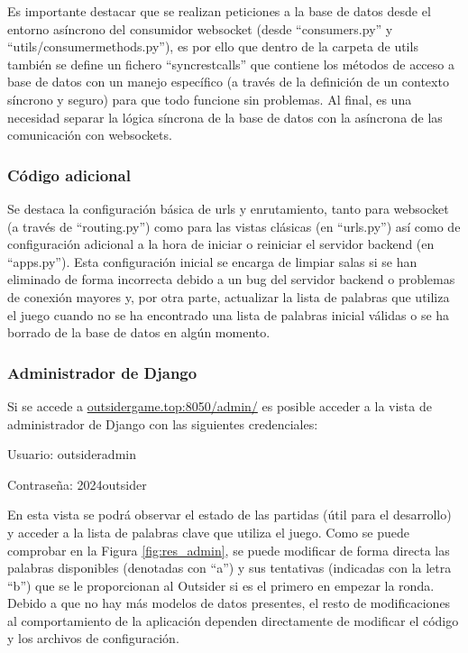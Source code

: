 Es importante destacar que se realizan peticiones a la base de datos desde el entorno asíncrono del consumidor websocket (desde ``consumers.py'' 
y ``utils/consumer\textunderscore methods.py''), es por ello que dentro de la carpeta de utils también se define un fichero ``sync\textunderscore rest\textunderscore calls'' que contiene 
los métodos de acceso a base de datos con un manejo específico (a través de la definición de un contexto síncrono y seguro) para que todo funcione sin problemas. Al final, es una necesidad
separar la lógica síncrona de la base de datos con la asíncrona de las comunicación con websockets.
	
\subsubsection{Código adicional}
Se destaca la configuración básica de urls y enrutamiento, tanto para websocket (a través de ``routing.py'') como para las vistas clásicas (en ``urls.py'') así como de 
configuración adicional a la hora de iniciar o reiniciar el servidor backend (en ``apps.py''). Esta configuración inicial se encarga de limpiar salas si se han eliminado 
de forma incorrecta debido a un bug del servidor backend o problemas de conexión mayores y, por otra parte, actualizar la lista de palabras que utiliza el juego cuando no se ha encontrado
una lista de palabras inicial válidas o se ha borrado de la base de datos en algún momento.

\subsubsection{Administrador de Django}

Si se accede a \href{http://outsidergame.top:8050/admin/}{outsidergame.top:8050/admin/} es posible 
acceder a la vista de administrador de Django con las siguientes credenciales:

\begin{compactitem}
	\item Usuario: outsider\textunderscore admin
	\item Contraseña: 2024outsider
\end{compactitem}

En esta vista se podrá observar el estado de las partidas (útil para el desarrollo) y acceder a la lista
de palabras clave que utiliza el juego. Como se puede comprobar en la Figura \ref{fig:res_admin}, se puede modificar de forma
directa las palabras disponibles (denotadas con ``a'') y sus tentativas (indicadas con la letra ``b'') 
que se le proporcionan al Outsider si es el primero en empezar la ronda. Debido a que no hay más modelos de 
datos presentes, el resto de modificaciones al comportamiento de la aplicación dependen 
directamente de modificar el código y los archivos de configuración.

